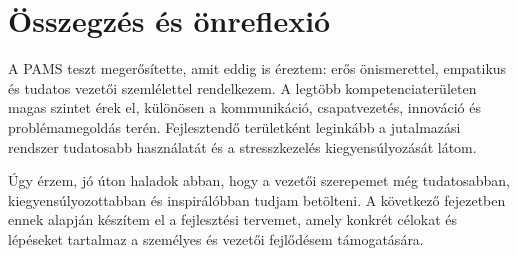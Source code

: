 \section{Összegzés és önreflexió}

A PAMS teszt megerősítette, amit eddig is éreztem: erős önismerettel, empatikus és tudatos vezetői szemlélettel rendelkezem.
A legtöbb kompetenciaterületen magas szintet érek el, különösen a kommunikáció, 
csapatvezetés, innováció és problémamegoldás terén.
Fejlesztendő területként leginkább a jutalmazási rendszer tudatosabb használatát és a stresszkezelés kiegyensúlyozását látom.

Úgy érzem, jó úton haladok abban, hogy a vezetői szerepemet még tudatosabban, 
kiegyensúlyozottabban és inspirálóbban tudjam betölteni.
A következő fejezetben ennek alapján készítem el a fejlesztési tervemet, amely 
konkrét célokat és lépéseket tartalmaz a személyes és vezetői fejlődésem támogatására.
